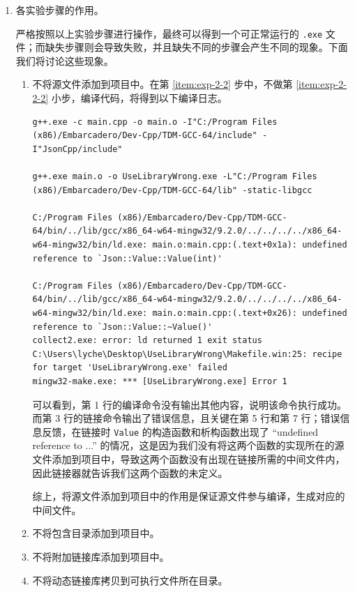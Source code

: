 \begin{enumerate}
	\item 各实验步骤的作用。

	严格按照以上实验步骤进行操作，最终可以得到一个可正常运行的 \lstinline[language={}]{.exe} 文件；而缺失步骤则会导致失败，并且缺失不同的步骤会产生不同的现象。下面我们将讨论这些现象。

	\begin{enumerate}
		\item 不将源文件添加到项目中。在第 \ref{item:exp-2-2} 步中，不做第 \ref{item:exp-2-2-2} 小步，编译代码，将得到以下编译日志。

		\begin{lstlisting}[language={}]
g++.exe -c main.cpp -o main.o -I"C:/Program Files (x86)/Embarcadero/Dev-Cpp/TDM-GCC-64/include" -I"JsonCpp/include"

g++.exe main.o -o UseLibraryWrong.exe -L"C:/Program Files (x86)/Embarcadero/Dev-Cpp/TDM-GCC-64/lib" -static-libgcc

C:/Program Files (x86)/Embarcadero/Dev-Cpp/TDM-GCC-64/bin/../lib/gcc/x86_64-w64-mingw32/9.2.0/../../../../x86_64-w64-mingw32/bin/ld.exe: main.o:main.cpp:(.text+0x1a): undefined reference to `Json::Value::Value(int)'

C:/Program Files (x86)/Embarcadero/Dev-Cpp/TDM-GCC-64/bin/../lib/gcc/x86_64-w64-mingw32/9.2.0/../../../../x86_64-w64-mingw32/bin/ld.exe: main.o:main.cpp:(.text+0x26): undefined reference to `Json::Value::~Value()'
collect2.exe: error: ld returned 1 exit status
C:\Users\lyche\Desktop\UseLibraryWrong\Makefile.win:25: recipe for target 'UseLibraryWrong.exe' failed
mingw32-make.exe: *** [UseLibraryWrong.exe] Error 1
		\end{lstlisting}

		可以看到，第 1 行的编译命令没有输出其他内容，说明该命令执行成功。而第 3 行的链接命令输出了错误信息，且关键在第 5 行和第 7 行；错误信息反馈，在链接时 \lstinline[language={[17]C++}, moreemph={[1]Value}]{Value} 的构造函数和析构函数出现了 “undefined reference to ...” 的情况，这是因为我们没有将这两个函数的实现所在的源文件添加到项目中，导致这两个函数没有出现在链接所需的中间文件内，因此链接器就告诉我们这两个函数的未定义。

		综上，将源文件添加到项目中的作用是保证源文件参与编译，生成对应的中间文件。

		\item 不将包含目录添加到项目中。

		\item 不将附加链接库添加到项目中。

		\item 不将动态链接库拷贝到可执行文件所在目录。
	\end{enumerate}
\end{enumerate}
